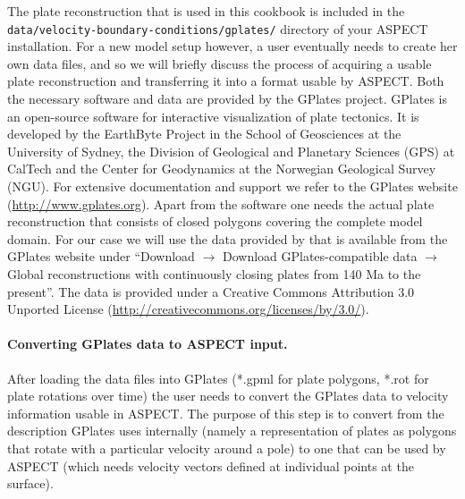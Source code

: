 \documentclass{article}
\newcommand{\aspect}{\textsc{ASPECT}}
\begin{document}
The plate reconstruction that is used in this cookbook is included in
the \texttt{data/velocity-boundary-conditions/gplates/} directory of
your \aspect{} installation.
For a new model setup however, a user eventually needs to create her own data
files, and so we will briefly discuss the process of acquiring a usable plate
reconstruction and transferring it into a format usable by \aspect{}.
Both the necessary software and data are provided by the GPlates project.
GPlates is an open-source software for interactive visualization of plate
tectonics. It is developed by the EarthByte Project in the School of Geosciences
at the University of Sydney, the Division of Geological and Planetary Sciences
(GPS) at CalTech and the Center for Geodynamics at the Norwegian Geological
Survey (NGU). For extensive documentation and support we refer to the GPlates
website (\url{http://www.gplates.org}). Apart from the software one needs the
actual plate reconstruction that consists of closed polygons covering the
complete model domain. For our case we will use the data provided by
\cite{GTZDSMBSMB12} that is available from the GPlates website under ``Download
$\rightarrow$ Download GPlates-compatible data $\rightarrow$ Global
reconstructions with continuously closing plates from 140 Ma to the present''.
The data is provided under a Creative Commons Attribution 3.0 Unported License
(\url{http://creativecommons.org/licenses/by/3.0/}).

\paragraph{Converting GPlates data to \aspect{} input.}

After loading the data
files into GPlates (*.gpml for plate polygons, *.rot for plate rotations over
time) the user needs to convert the GPlates data to velocity
information usable in \aspect{}. The purpose of this step is to convert from the
description GPlates uses internally (namely a representation of plates as
polygons that rotate with a particular velocity around a pole) to one that can
be used by \aspect{} (which needs velocity vectors defined at individual points
at the surface).
\end{document}
